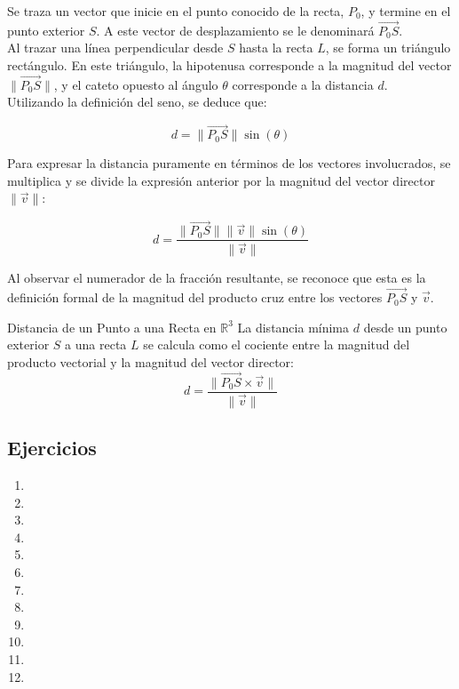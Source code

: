 Se traza un vector que inicie en el punto conocido de la recta, $P_0$, y termine en el punto exterior $S$. A este vector de desplazamiento se le denominará $\vec{P_0S}$.\\

Al trazar una línea perpendicular desde $S$ hasta la recta $L$, se forma un triángulo rectángulo. En este triángulo, la hipotenusa corresponde a la magnitud del vector $\|\vec{P_0S}\|$, y el cateto opuesto al ángulo $\theta$ corresponde a la distancia $d$. \\

Utilizando la definición del seno, se deduce que:

$$ d = \|\vec{P_0S}\| \sin(\theta) $$

Para expresar la distancia puramente en términos de los vectores involucrados, se multiplica y se divide la expresión anterior por la magnitud del vector director $\|\vec{v}\|$:

$$ d = \frac{\|\vec{P_0S}\| \|\vec{v}\| \sin(\theta)}{\|\vec{v}\|} $$

Al observar el numerador de la fracción resultante, se reconoce que esta es la definición formal de la magnitud del producto cruz entre los vectores $\vec{P_0S}$ y $\vec{v}$.

\begin{mydefinition}{Distancia de un Punto a una Recta en $\mathbb{R}^3$}
La distancia mínima $d$ desde un punto exterior $S$ a una recta $L$ se calcula como el cociente entre la magnitud del producto vectorial y la magnitud del vector director:
$$ d = \frac{\|\vec{P_0S} \times \vec{v}\|}{\|\vec{v}\|} $$
\end{mydefinition}

\subsection{Ejercicios}

\begin{enumerate}
    \item 
    \item 
    \item 
    \item 
    \item 
    \item 
    \item 
    \item 
    \item 
    \item 
    \item 
    \item 
\end{enumerate}
